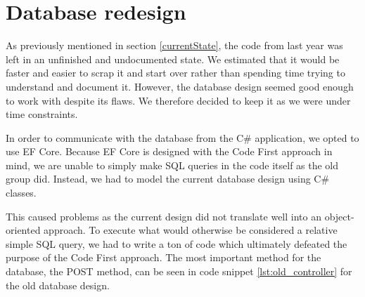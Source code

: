 \section{Database redesign}

As previously mentioned in section \ref{currentState}, the code from last year was left in an unfinished and undocumented state. We estimated that it would be faster and easier to scrap it and start over rather than spending time trying to understand and document it.
However, the database design seemed good enough to work with despite its flaws. 
We therefore decided to keep it as we were under time constraints.

In order to communicate with the database from the C\# application, we opted to use EF Core.
Because EF Core is designed with the Code First approach in mind, we are unable to simply make SQL queries in the code itself as the old group did. 
Instead, we had to model the current database design using C\# classes. 

This caused problems as the current design did not translate well into an object-oriented approach.
To execute what would otherwise be considered a relative simple SQL query, we had to write a ton of code which ultimately defeated the purpose of the Code First approach. 
The most important method for the database, the POST method, can be seen in code snippet \ref{lst:old_controller} for the old database design.

